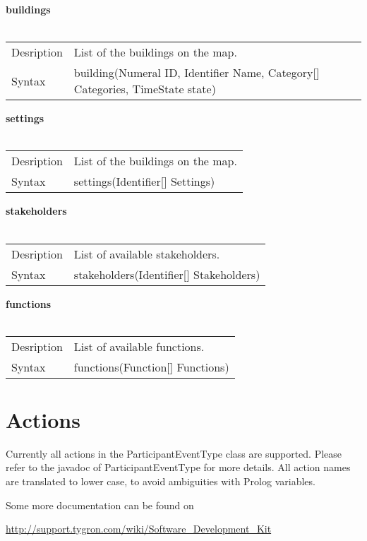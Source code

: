 \documentclass[english,11pt]{article}
\begin{document}
\textbf{buildings}\\
\\
\begin{tabularx}{\textwidth}{lX}
 Desription & List of the buildings on the map. \\
 Syntax & building(Numeral ID, Identifier Name, Category[] Categories, TimeState state) \\
\end{tabularx}
\newline

\textbf{settings}\\
\\
\begin{tabularx}{\textwidth}{lX}
 Desription & List of the buildings on the map. \\
 Syntax & settings(Identifier[] Settings) \\
\end{tabularx}
\newline

\textbf{stakeholders}\\
\\
\begin{tabularx}{\textwidth}{lX}
 Desription & List of available stakeholders. \\
 Syntax & stakeholders(Identifier[] Stakeholders) \\
\end{tabularx}
\newline

\textbf{functions}\\
\\
\begin{tabularx}{\textwidth}{lX}
 Desription & List of available functions. \\
 Syntax & functions(Function[] Functions) \\
\end{tabularx}
\newline



\section{Actions}

Currently all actions in the ParticipantEventType class are supported. Please refer to the javadoc of ParticipantEventType for more details. All action names are translated to lower case, to avoid ambiguities with Prolog variables.

Some more documentation can be found on

\url{http://support.tygron.com/wiki/Software_Development_Kit}
\end{document}
